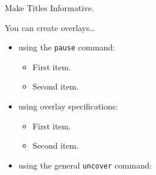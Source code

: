 \documentclass[ucs,8pt]{beamer}
\begin{document}
\begin{frame}{Make Titles Informative.}

  You can create overlays\dots
  \begin{itemize}
  \item using the \texttt{pause} command:
    \begin{itemize}
    \item
      First item.
      \pause
    \item    
      Second item.
    \end{itemize}
  \item
    using overlay specifications:
    \begin{itemize}
    \item<3->
      First item.
    \item<4->
      Second item.
    \end{itemize}
  \item
    using the general \texttt{uncover} command:
    \begin{itemize}
    \end{itemize}
  \end{itemize}
\end{frame}
\end{document}
